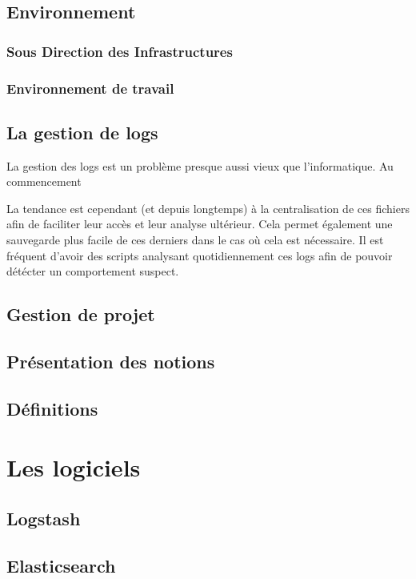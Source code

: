 \documentclass[a4paper,12pt,one side,titlepage]{report}
\begin{document}
\chapter{Environnement}
\section{Sous Direction des Infrastructures}
\section{Environnement de travail}

\chapter{La gestion de logs}

La gestion des \gls{logs} est un problème presque aussi vieux que l'informatique.
Au commencement 

La tendance est cependant (et depuis longtemps) à la centralisation de ces fichiers afin de faciliter 
leur accès et leur analyse ultérieur. Cela permet également une sauvegarde plus facile de ces derniers 
dans le cas où cela est nécessaire. Il est fréquent d'avoir des scripts analysant 
quotidiennement ces \gls{logs} afin de pouvoir détécter un comportement suspect.


\chapter{Gestion de projet}
%
\chapter{Présentation des notions}
\chapter{Définitions}

\part{Les logiciels}
\chapter{Logstash}


\chapter{Elasticsearch}

\end{document}
